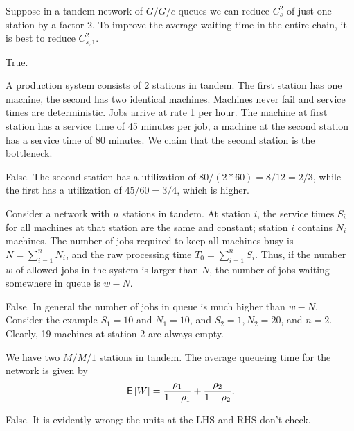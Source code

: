 \documentclass[stochastic-or.tex]{subfiles}
\begin{document}
\begin{truefalse}
Suppose in a tandem network of $G/G/c$ queues we can reduce $C_{s}^2$ of just one station by a factor 2.
To improve the average waiting time in the entire chain, it is best to reduce $C_{s,1}^2$.
\begin{solution}
True.
\end{solution}
\end{truefalse}

\begin{truefalse}
A production system consists of 2 stations in tandem.
The first station has one machine, the second has two identical machines.
Machines never fail and service times are deterministic.
Jobs arrive at rate 1 per hour.
The machine at first station has a service time of 45 minutes per job, a machine at the second station has a service time of 80 minutes.
We claim that the second station is the bottleneck.
\begin{solution}
False. The second station has a utilization of $80/(2*60) = 8/12 = 2/3$, while the first has a utilization of $45/60 = 3/4$, which is higher.
\end{solution}
\end{truefalse}

\begin{truefalse}
Consider a network with $n$ stations in tandem.
At station $i$, the service times $S_i$ for all machines at that station are the same and constant; station $i$ contains $N_i$ machines.
The number of jobs required to keep all machines busy is $N=\sum_{i=1}^n N_i$, and the raw processing time $T_0=\sum_{i=1}^n S_i$.
Thus, if the number $w$ of allowed jobs in the system is larger than $N$, the number of jobs waiting somewhere in queue is $w-N$.
\begin{solution}
False.
In general the number of jobs in queue is much higher than $w-N$.
Consider the example $S_1=10$ and $N_1=10$, and $S_2=1, N_2=20$, and $n=2$.
Clearly, 19 machines at station 2 are always empty.
\end{solution}
\end{truefalse}

\begin{truefalse}
We have two $M/M/1$ stations in tandem. The average queueing time for the network is given by
\begin{equation*}
\,\mathsf{E}\left[W\right] = \frac{\rho_1}{1-\rho_1} + \frac{\rho_2}{1-\rho_2}.
\end{equation*}
\begin{solution}
False. It is evidently wrong: the units at the LHS and RHS don't check.
\end{solution}
\end{truefalse}
\end{document}
